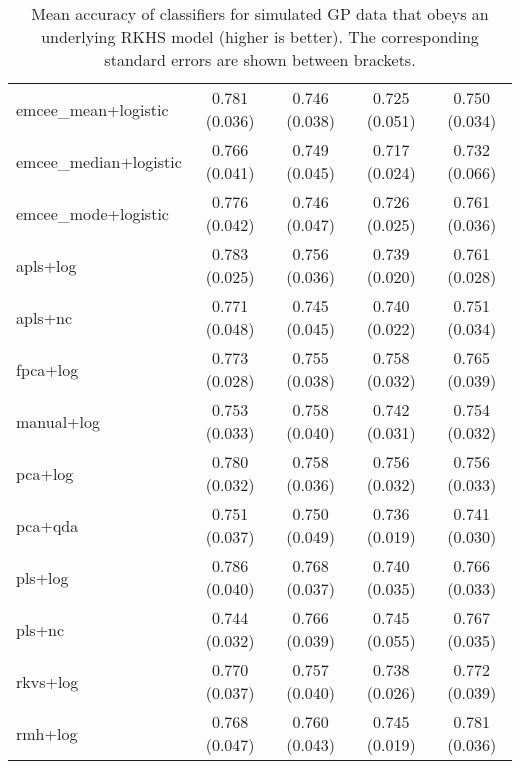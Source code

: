 \begin{table}[htbp!]
\begin{tabular}{lcccc}
  emcee\_mean+logistic & 0.781 (0.036) &       0.746 (0.038) &      0.725 (0.051) & 0.750 (0.034) \\
emcee\_median+logistic & 0.766 (0.041) &       0.749 (0.045) &      0.717 (0.024) & 0.732 (0.066) \\
  emcee\_mode+logistic & 0.776 (0.042) &       0.746 (0.047) &      0.726 (0.025) & 0.761 (0.036) \\
             apls+log & 0.783 (0.025) &       0.756 (0.036) &      0.739 (0.020) & 0.761 (0.028) \\
              apls+nc & 0.771 (0.048) &       0.745 (0.045) &      0.740 (0.022) & 0.751 (0.034) \\
             fpca+log & 0.773 (0.028) &       0.755 (0.038) &      0.758 (0.032) & 0.765 (0.039) \\
           manual+log & 0.753 (0.033) &       0.758 (0.040) &      0.742 (0.031) & 0.754 (0.032) \\
              pca+log & 0.780 (0.032) &       0.758 (0.036) &      0.756 (0.032) & 0.756 (0.033) \\
              pca+qda & 0.751 (0.037) &       0.750 (0.049) &      0.736 (0.019) & 0.741 (0.030) \\
              pls+log & 0.786 (0.040) &       0.768 (0.037) &      0.740 (0.035) & 0.766 (0.033) \\
               pls+nc & 0.744 (0.032) &       0.766 (0.039) &      0.745 (0.055) & 0.767 (0.035) \\
             rkvs+log & 0.770 (0.037) &       0.757 (0.040) &      0.738 (0.026) & 0.772 (0.039) \\
              rmh+log & 0.768 (0.047) &       0.760 (0.043) &      0.745 (0.019) & 0.781 (0.036) \\
\bottomrule
\end{tabular}
  \caption{Mean accuracy of classifiers for simulated GP data that obeys an underlying RKHS model (higher is better). The corresponding standard errors are shown between brackets.}
\end{table}

\newpage

